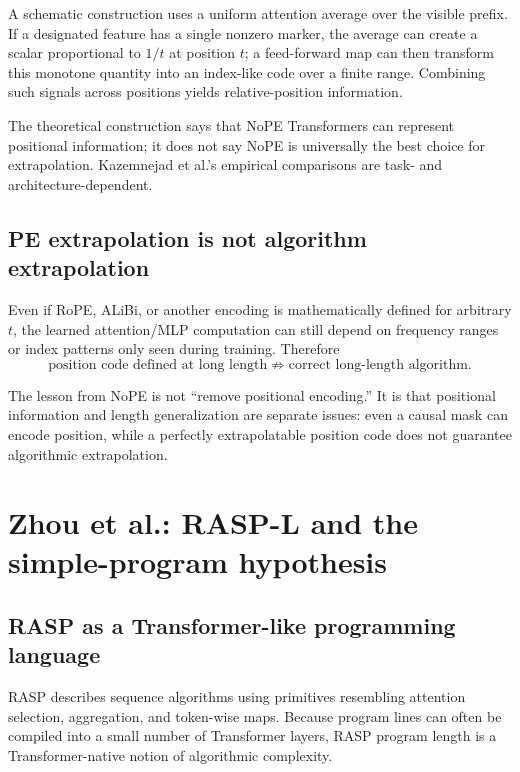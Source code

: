 \documentclass[11pt,a4paper,oneside,openany]{memoir}
\theoremstyle{definition}
\begin{document}
A schematic construction uses a uniform attention average over the visible prefix.  If a designated feature has a single nonzero marker, the average can create a scalar proportional to $1/t$ at position $t$; a feed-forward map can then transform this monotone quantity into an index-like code over a finite range.  Combining such signals across positions yields relative-position information.

\begin{warningbox}
The theoretical construction says that NoPE Transformers can represent positional information; it does not say NoPE is universally the best choice for extrapolation.  Kazemnejad et al.'s empirical comparisons are task- and architecture-dependent.
\end{warningbox}

\section{PE extrapolation is not algorithm extrapolation}
Even if RoPE, ALiBi, or another encoding is mathematically defined for arbitrary $t$, the learned attention/MLP computation can still depend on frequency ranges or index patterns only seen during training.  Therefore
\[
\text{position code defined at long length}
\not\Rightarrow
\text{correct long-length algorithm}.
\]

\begin{presentbox}
The lesson from NoPE is not ``remove positional encoding.''  It is that positional information and length generalization are separate issues: even a causal mask can encode position, while a perfectly extrapolatable position code does not guarantee algorithmic extrapolation.
\end{presentbox}

\chapter{Zhou et al.: RASP-L and the simple-program hypothesis}
\section{RASP as a Transformer-like programming language}
RASP describes sequence algorithms using primitives resembling attention selection, aggregation, and token-wise maps.  Because program lines can often be compiled into a small number of Transformer layers, RASP program length is a Transformer-native notion of algorithmic complexity.
\end{document}

